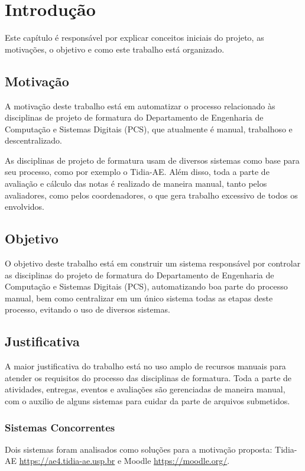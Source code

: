 \chapter{Introdução}\label{chap:introducao}
Este capítulo é responsável por explicar conceitos iniciais do projeto, as motivações, o objetivo e como este trabalho está organizado.

\section{Motivação}
A motivação deste trabalho está em automatizar o processo relacionado às disciplinas de projeto de formatura do Departamento de Engenharia de Computação e Sistemas Digitais (PCS), que atualmente é manual, trabalhoso e descentralizado.

As disciplinas de projeto de formatura usam de diversos sistemas como base para seu processo, como por exemplo o Tidia-AE. Além disso, toda a parte de avaliação e cálculo das notas é realizado de maneira manual, tanto pelos avaliadores, como pelos coordenadores, o que gera trabalho excessivo de todos os envolvidos.

\section{Objetivo}
O objetivo deste trabalho está em construir um sistema responsável por controlar as disciplinas do projeto de formatura do Departamento de Engenharia de Computação e Sistemas Digitais (PCS), automatizando boa parte do processo manual, bem como centralizar em um único sistema todas as etapas deste processo, evitando o uso de diversos sistemas.

\section{Justificativa}
A maior justificativa do trabalho está no uso amplo de recursos manuais para atender os requisitos do processo das disciplinas de formatura. Toda a parte de atividades, entregas, eventos e avaliações são gerenciadas de maneira manual, com o auxilio de alguns sistemas para cuidar da parte de arquivos submetidos.

\subsection{Sistemas Concorrentes}
Dois sistemas foram analisados como soluções para a motivação proposta: Tidia-AE \href{https://ae4.tidia-ae.usp.br}{https://ae4.tidia-ae.usp.br} e Moodle \href{https://moodle.org/}{https://moodle.org/}.

